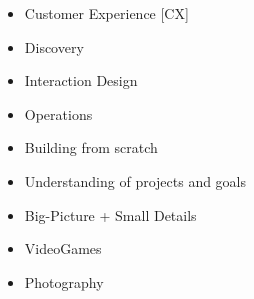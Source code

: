

\begin{itemize}
 \setlength\itemsep{-0.3em}
 \item Customer Experience [CX]
 \item Discovery
 \item Interaction Design 
 \item Operations
 \item Building from scratch
 \item Understanding of projects and goals
 \item Big-Picture + Small Details
 \item VideoGames
 \item Photography

\end{itemize}

